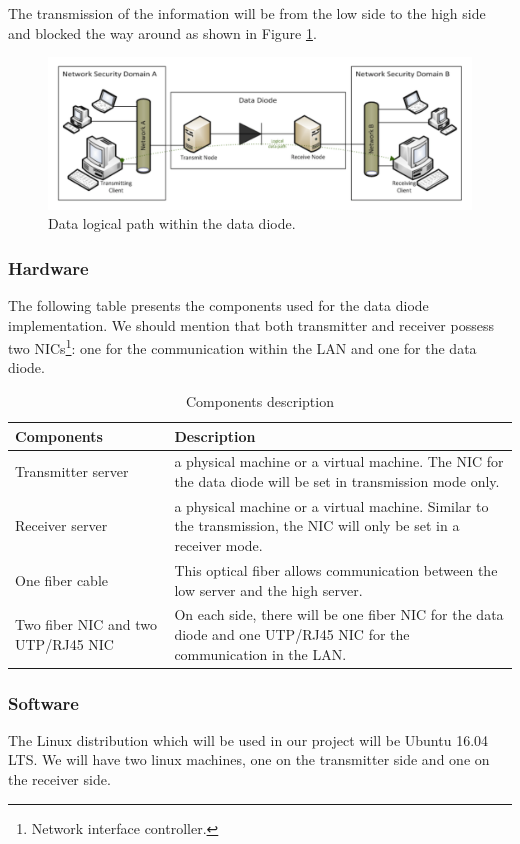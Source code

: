 \documentclass[a4paper,10pt]{article}
\begin{document}
The transmission of the information will be from the low side to the high side and blocked the way around as shown in Figure \ref{fig:UDPDD}.

\begin{figure}
\centering
\includegraphics[scale=0.5]{images/logical-scheme-DD.png}
\caption{Data logical path within the data diode.}
\label{fig:UDPDD}
\end{figure}

\subsubsection{Hardware}
The following table presents the components used for the data diode implementation. We should mention that both transmitter and receiver possess two NICs\footnote{Network interface controller.}: one for the communication within the LAN and one for the data diode.\bigskip
\begin{table}[!h]
\centering
\begin{tabular}{|p{3cm}|p{10.5cm}|}
	\hline
	\textbf{Components} & \textbf{Description}                 \\
	\hline
	Transmitter server  &  a physical machine or a virtual machine. The NIC for the data diode will be set in transmission mode only. \\
	\hline
	Receiver server  &  a physical machine or a virtual machine. Similar to the transmission, the NIC will only be set in a receiver mode.\\
	\hline
	One fiber cable & This optical fiber allows communication between the low server and the high server.\\
	\hline
	Two fiber NIC and two UTP/RJ45 NIC & On each side, there will be one fiber NIC for the data diode and one UTP/RJ45 NIC for the communication in the LAN.  \\
	\hline
\end{tabular}
\caption{Components description}
\label{tab:component}
\end{table}
\subsubsection{Software}
The Linux distribution which will be used in our project will be Ubuntu 16.04 LTS. We will have two linux machines, one on the transmitter side and one on the receiver side. 
\end{document}
